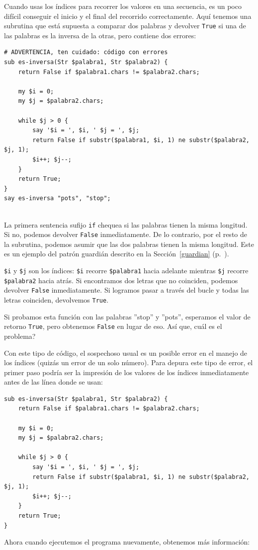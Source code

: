Cuando usas los índices para recorrer los valores en una secuencia,
es un poco difícil conseguir el inicio y el final del recorrido 
correctamente. Aquí tenemos una subrutina que está supuesta a 
comparar dos palabras y devolver {\tt True} si una de las palabras
es la inversa de la otras, pero contiene dos errores:

\begin{verbatim}
# ADVERTENCIA, ten cuidado: código con errores
sub es-inversa(Str $palabra1, Str $palabra2) {
    return False if $palabra1.chars != $palabra2.chars;
    
    my $i = 0;
    my $j = $palabra2.chars;

    while $j > 0 {
    	say '$i = ', $i, ' $j = ', $j;
        return False if substr($palabra1, $i, 1) ne substr($palabra2, $j, 1);
        $i++; $j--;
    }
    return True;
}
say es-inversa "pots", "stop";


\end{verbatim}
%
La primera sentencia sufijo {\tt if} chequea si las palabras
tienen la misma longitud. Si no, podemos devolver {\tt False}
inmediatamente. De lo contrario, por el resto de la subrutina, 
podemos asumir que las dos palabras tienen la misma longitud.
Este es un ejemplo del patrón guardián descrito en la 
Sección~\ref{guardian} (p.~\pageref{guardian}).

{\tt \$i} y {\tt \$j} son los índices: {\tt \$i} 
recorre {\tt \$palabra1} hacia adelante mientras {\tt \$j}
recorre {\tt \$palabra2} hacia atrás. Si encontramos dos letras
que no coinciden, podemos devolver {\tt False} inmediatamente.
Si logramos pasar a través del bucle y todas las letras
coinciden, devolvemos {\tt True}.

Si probamos esta función con las palabras ''stop'' y ''pots'',
esperamos el valor de retorno {\tt True}, pero obtenemos 
{\tt False} en lugar de eso. Así que, cuál es el problema?

Con este tipo de código, el sospechoso usual es un posible error
en el manejo de los índices (quizás un error de un solo número).
Para depura este tipo de error, el primer paso podría ser la
impresión de los valores de los índices inmediatamente 
antes de las línea donde se usan:

\begin{verbatim}
sub es-inversa(Str $palabra1, Str $palabra2) {
	return False if $palabra1.chars != $palabra2.chars;

	my $i = 0;
	my $j = $palabra2.chars;

	while $j > 0 {
		say '$i = ', $i, ' $j = ', $j;
		return False if substr($palabra1, $i, 1) ne substr($palabra2, $j, 1);
		$i++; $j--;
	}
	return True;
}
\end{verbatim}
%
Ahora cuando ejecutemos el programa nuevamente, obtenemos
más información:

